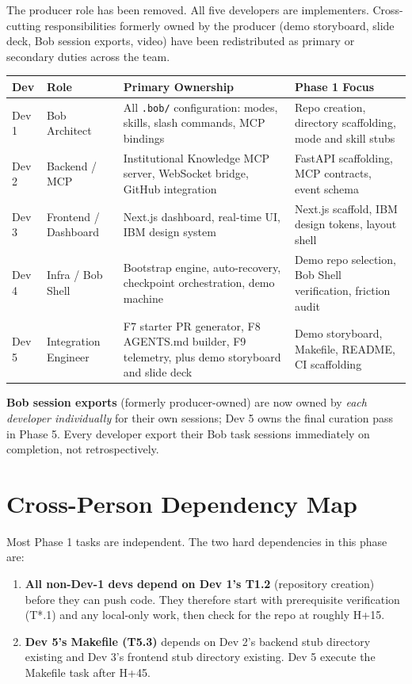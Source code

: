 \documentclass[11pt,letterpaper]{article}
\begin{document}
The producer role has been removed. All five developers are implementers. Cross-cutting responsibilities formerly owned by the producer (demo storyboard, slide deck, Bob session exports, video) have been redistributed as primary or secondary duties across the team.

\begin{longtable}{|p{1.5cm}|p{3.2cm}|p{5cm}|p{4.5cm}|}
\hline
\rowcolor{ibmblue!10}
\textbf{Dev} & \textbf{Role} & \textbf{Primary Ownership} & \textbf{Phase 1 Focus} \\
\hline
Dev 1 & Bob Architect & All \texttt{.bob/} configuration: modes, skills, slash commands, MCP bindings & Repo creation, directory scaffolding, mode and skill stubs \\
\hline
Dev 2 & Backend / MCP & Institutional Knowledge MCP server, WebSocket bridge, GitHub integration & FastAPI scaffolding, MCP contracts, event schema \\
\hline
Dev 3 & Frontend / Dashboard & Next.js dashboard, real-time UI, IBM design system & Next.js scaffold, IBM design tokens, layout shell \\
\hline
Dev 4 & Infra / Bob Shell & Bootstrap engine, auto-recovery, checkpoint orchestration, demo machine & Demo repo selection, Bob Shell verification, friction audit \\
\hline
Dev 5 & Integration Engineer & F7 starter PR generator, F8 AGENTS.md builder, F9 telemetry, plus demo storyboard and slide deck & Demo storyboard, Makefile, README, CI scaffolding \\
\hline
\end{longtable}

\textbf{Bob session exports} (formerly producer-owned) are now owned by \textit{each developer individually} for their own sessions; Dev 5 owns the final curation pass in Phase 5. Every developer \shall{} export their Bob task sessions immediately on completion, not retrospectively.

\section{Cross-Person Dependency Map}

Most Phase 1 tasks are independent. The two hard dependencies in this phase are:

\begin{enumerate}
  \item \textbf{All non-Dev-1 devs depend on Dev 1's T1.2} (repository creation) before they can push code. They \shall{} therefore start with prerequisite verification (T*.1) and any local-only work, then check for the repo at roughly H+15.
  \item \textbf{Dev 5's Makefile (T5.3)} depends on Dev 2's backend stub directory existing and Dev 3's frontend stub directory existing. Dev 5 \shall{} execute the Makefile task after H+45.
\end{enumerate}
\end{document}
